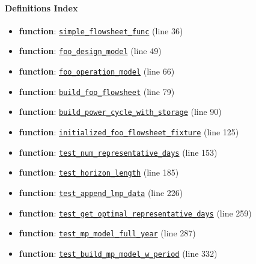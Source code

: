 \documentclass[11pt]{report}
\begin{document}
\paragraph{Definitions Index}
\begin{itemize}[leftmargin=*]
  \item \textbf{function}: \hyperref[def:pricetaker-tests-test_price_taker_model.py:simple_flowsheet_func:L36]{\texttt{simple\_flowsheet\_func}} (line 36)
  \item \textbf{function}: \hyperref[def:pricetaker-tests-test_price_taker_model.py:foo_design_model:L49]{\texttt{foo\_design\_model}} (line 49)
  \item \textbf{function}: \hyperref[def:pricetaker-tests-test_price_taker_model.py:foo_operation_model:L66]{\texttt{foo\_operation\_model}} (line 66)
  \item \textbf{function}: \hyperref[def:pricetaker-tests-test_price_taker_model.py:build_foo_flowsheet:L79]{\texttt{build\_foo\_flowsheet}} (line 79)
  \item \textbf{function}: \hyperref[def:pricetaker-tests-test_price_taker_model.py:build_power_cycle_with_storage:L90]{\texttt{build\_power\_cycle\_with\_storage}} (line 90)
  \item \textbf{function}: \hyperref[def:pricetaker-tests-test_price_taker_model.py:initialized_foo_flowsheet_fixture:L125]{\texttt{initialized\_foo\_flowsheet\_fixture}} (line 125)
  \item \textbf{function}: \hyperref[def:pricetaker-tests-test_price_taker_model.py:test_num_representative_days:L153]{\texttt{test\_num\_representative\_days}} (line 153)
  \item \textbf{function}: \hyperref[def:pricetaker-tests-test_price_taker_model.py:test_horizon_length:L185]{\texttt{test\_horizon\_length}} (line 185)
  \item \textbf{function}: \hyperref[def:pricetaker-tests-test_price_taker_model.py:test_append_lmp_data:L226]{\texttt{test\_append\_lmp\_data}} (line 226)
  \item \textbf{function}: \hyperref[def:pricetaker-tests-test_price_taker_model.py:test_get_optimal_representative_days:L259]{\texttt{test\_get\_optimal\_representative\_days}} (line 259)
  \item \textbf{function}: \hyperref[def:pricetaker-tests-test_price_taker_model.py:test_mp_model_full_year:L287]{\texttt{test\_mp\_model\_full\_year}} (line 287)
  \item \textbf{function}: \hyperref[def:pricetaker-tests-test_price_taker_model.py:test_build_mp_model_w_period:L332]{\texttt{test\_build\_mp\_model\_w\_period}} (line 332)

\end{itemize}
\end{document}
